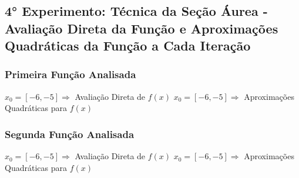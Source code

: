 

\subsection{4° Experimento: Técnica da Seção Áurea - Avaliação Direta da Função e Aproximações Quadráticas da Função a Cada Iteração}
    \subsubsection{Primeira Função Analisada}

        \begin{minipage}[h!]{\linewidth}
            \centering
            $x_0=[-6,-5]\Longrightarrow$  Avaliação Direta de $f(x)$            
            \label{tab:tblt} 
            \writetable{\tblt}
            \bigskip
            \centering
            $x_0=[-6,-5]\Longrightarrow$  Aproximações Quadráticas para $f(x)$
            \label{tab:tblu} 
            \writetable{\tblu}
        \end{minipage}
        
    \subsubsection{Segunda Função Analisada}

        \begin{minipage}[h!]{\linewidth}
            \centering
            $x_0=[-6,-5]\Longrightarrow$  Avaliação Direta de $f(x)$            
            \label{tab:tblv} 
            \writetable{\tblv}
            \bigskip
            \centering
            $x_0=[-6,-5]\Longrightarrow$  Aproximações Quadráticas para $f(x)$
            \label{tab:tblx} 
            \writetable{\tblx}
        \end{minipage}

\newpage